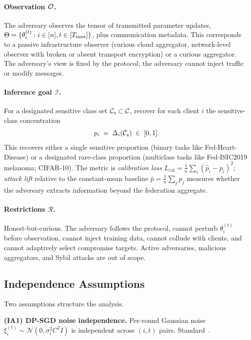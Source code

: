 \paragraph{Observation $\mathcal{O}$.} The adversary observes the tensor of
transmitted parameter updates,
$\Theta = \{\theta_i^{(t)} : i \in [n], t \in [T_{\max}]\}$, plus
communication metadata. This corresponds to a passive infrastructure
observer (\eg curious cloud aggregator, network-level observer with
broken or absent transport encryption) or a curious aggregator. The
adversary's view is fixed by the protocol; the adversary cannot inject
traffic or modify messages.

\paragraph{Inference goal $\mathcal{I}$.} For a designated sensitive
class set $\mathcal{C}_{s} \subset \mathcal{C}$, recover for each client $i$ the
sensitive-class concentration
\[
p_i \;=\; \Delta_i(\mathcal{C}_{s}) \;\in\; [0,1].
\]
This recovers either a single sensitive proportion (binary tasks like
Fed-Heart-Disease) or a designated rare-class proportion (multiclass
tasks like Fed-ISIC2019 melanoma; CIFAR-10). The metric is
\emph{calibration loss} $L_{\text{cal}} = \frac{1}{n}\sum_i (\hat p_i - p_i)^2$;
\emph{attack lift} relative to the constant-mean baseline
$\bar p = \frac{1}{n}\sum_j p_j$ measures whether the adversary extracts
information beyond the federation aggregate.

\paragraph{Restrictions $\mathcal{R}$.} Honest-but-curious. The adversary
follows the protocol, cannot perturb $\theta_i^{(t)}$ before observation,
cannot inject training data, cannot collude with clients, and cannot
adaptively select compromise targets. Active adversaries, malicious
aggregators, and Sybil attacks are out of scope.

\subsection{Independence Assumptions}
\label{sec:independence}

Two assumptions structure the analysis.

\textbf{(IA1) DP-SGD noise independence.} Per-round Gaussian noise
$\xi_i^{(t)} \sim \mathcal{N}(0, \sigma_i^2 C^2 I)$ is independent
across $(i,t)$ pairs. Standard~\cite{abadi2016dpsgd}.

